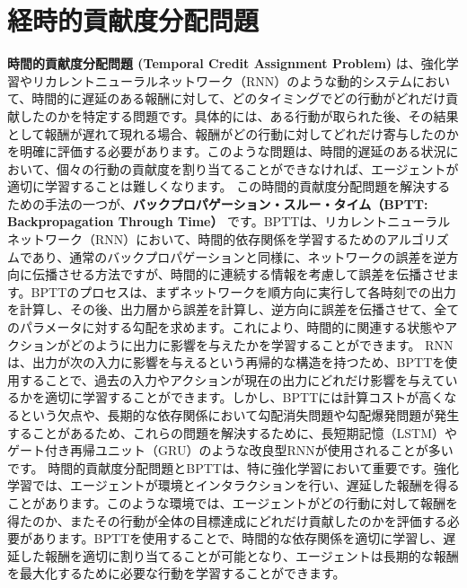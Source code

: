 \section{経時的貢献度分配問題}
\textbf{時間的貢献度分配問題 (Temporal Credit Assignment Problem)} は、強化学習やリカレントニューラルネットワーク（RNN）のような動的システムにおいて、時間的に遅延のある報酬に対して、どのタイミングでどの行動がどれだけ貢献したのかを特定する問題です。具体的には、ある行動が取られた後、その結果として報酬が遅れて現れる場合、報酬がどの行動に対してどれだけ寄与したのかを明確に評価する必要があります。このような問題は、時間的遅延のある状況において、個々の行動の貢献度を割り当てることができなければ、エージェントが適切に学習することは難しくなります。
この時間的貢献度分配問題を解決するための手法の一つが、\textbf{バックプロパゲーション・スルー・タイム（BPTT: Backpropagation Through Time）} です。BPTTは、リカレントニューラルネットワーク（RNN）において、時間的依存関係を学習するためのアルゴリズムであり、通常のバックプロパゲーションと同様に、ネットワークの誤差を逆方向に伝播させる方法ですが、時間的に連続する情報を考慮して誤差を伝播させます。BPTTのプロセスは、まずネットワークを順方向に実行して各時刻での出力を計算し、その後、出力層から誤差を計算し、逆方向に誤差を伝播させて、全てのパラメータに対する勾配を求めます。これにより、時間的に関連する状態やアクションがどのように出力に影響を与えたかを学習することができます。
RNNは、出力が次の入力に影響を与えるという再帰的な構造を持つため、BPTTを使用することで、過去の入力やアクションが現在の出力にどれだけ影響を与えているかを適切に学習することができます。しかし、BPTTには計算コストが高くなるという欠点や、長期的な依存関係において勾配消失問題や勾配爆発問題が発生することがあるため、これらの問題を解決するために、長短期記憶（LSTM）やゲート付き再帰ユニット（GRU）のような改良型RNNが使用されることが多いです。
時間的貢献度分配問題とBPTTは、特に強化学習において重要です。強化学習では、エージェントが環境とインタラクションを行い、遅延した報酬を得ることがあります。このような環境では、エージェントがどの行動に対して報酬を得たのか、またその行動が全体の目標達成にどれだけ貢献したのかを評価する必要があります。BPTTを使用することで、時間的な依存関係を適切に学習し、遅延した報酬を適切に割り当てることが可能となり、エージェントは長期的な報酬を最大化するために必要な行動を学習することができます。
